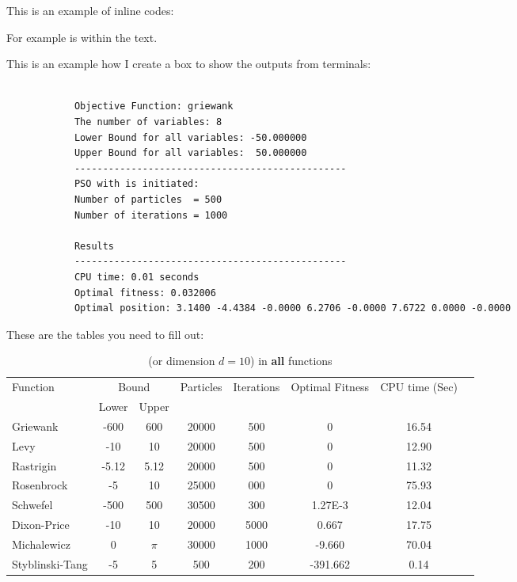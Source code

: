 \documentclass[12pt]{article}
\begin{document}
	
	
	
	
	This is an example of inline codes:
	
	{\scriptsize {}}
	
	
	For example  is within the text.
	
	This is an example how I create a box to show the outputs from terminals:
	
	\begin{mdframed}[style=myboxstyleTerminal1]
		\footnotesize
		\begin{verbatim}
			
			Objective Function: griewank
			The number of variables: 8
			Lower Bound for all variables: -50.000000
			Upper Bound for all variables:  50.000000
			------------------------------------------------
			PSO with is initiated:
			Number of particles  = 500
			Number of iterations = 1000 
			
			Results
			------------------------------------------------
			CPU time: 0.01 seconds
			Optimal fitness: 0.032006
			Optimal position: 3.1400 -4.4384 -0.0000 6.2706 -0.0000 7.6722 0.0000 -0.0000
		\end{verbatim}
	\end{mdframed}
	
	These are the tables you need to fill out:
	
	\begin{table}[H]
		\caption{ (or dimension $d=10$) in \textbf{all} functions}
		\label{table:1}
		\centering
		\begin{tabular}{l c c c c c c c}
			\hline
			Function &  \multicolumn{2}{c}{Bound} & Particles & Iterations &  Optimal Fitness & CPU time (Sec) \\
			& Lower& Upper&&&\\
			\hline
			Griewank  		&  -600   & 600 	&20000 &500  &0  &16.54 &\\
			Levy 	  		&  -10    & 10 		&20000 &500 &0 &12.90 &\\
			Rastrigin 		&  -5.12  & 5.12 	&20000 &500 &0 &11.32 &\\
			Rosenbrock		&  -5     & 10 		&25000 &000 &0 &75.93 &\\
			Schwefel 	 	&  -500   & 500 	&30500 &300 &1.27E-3 &12.04 &\\
			Dixon-Price 	&   -10	  & 10 		&20000 &5000 &0.667 &17.75 &\\
			Michalewicz 	&   0 	  & $\pi$ 	&30000 &1000 &-9.660 &70.04 &\\
			Styblinski-Tang & -5 	  & 5  		&500 &200 &-391.662 &0.14 &\\
			\hline
		\end{tabular}
	\end{table}
	
\end{document}
